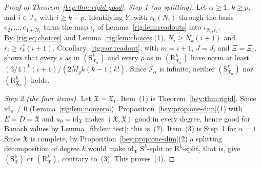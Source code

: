 \documentclass[11pt]{amsart}
\theoremstyle{definition}
\theoremstyle{remark}
\numberwithin{equation}{section}
\newcommand{\id}{\mathrm{id}}
\theoremstyle{plain}
\theoremstyle{definition}
\theoremstyle{plain}
\newcommand{\fX}{\mathfrak X}
\begin{document}
\begin{proof}[Proof of Theorem~\textup{\ref{bey:thm:rigid-good}}]
\emph{Step 1 (no splitting).} Let $\alpha\ge1$, $k\ge p$, and $i\in\mathcal I_\alpha$ with $i\ge k-p$. Identifying $Y_i$
with $c_0(N_i)$ through the basis $e_2,\dots,e_{1+N_i}$ turns the map $\iota_i$ of Lemma~\ref{rig:lem:readouts} into
$\iota_{N_i,r_i}$. By~\eqref{rig:eq:choices} and Lemma~\ref{rig:lem:choices}(1), $N_i\ge N_k(i+1)$ and
$r_i\ge r^*_k(i+1)$. Corollary~\ref{rig:cor:readout}, with $m=i+1$, $J=J_i$ and $\Xi=\Xi_i$, shows that every $s$ as in
$(\mathrm S^k_{\fX_\alpha})$ and every $\rho$ as in $(\mathrm R^k_{\fX_\alpha})$ have norm at least
$(3/4)^k(i+1)/(2M_\varrho k(k-1)k!)$. Since $\mathcal I_\alpha$ is infinite, neither $(\mathrm S^k_{\fX_\alpha})$ nor
$(\mathrm R^k_{\fX_\alpha})$ holds.

\emph{Step 2 (the four items).} Let $\fX=\fX_1$. Item~(1) is Theorem~\ref{bey:thm:rigid}. Since $\id_\fX\ne0$
(Lemma~\ref{rig:lem:nonzero}), Proposition~\ref{bey:prop:one-dim}(1) with $E=D=\fX$ and $u_0=\id_\fX$ makes $(\fX,\fX)$
good in every degree, hence good for Banach values by Lemma~\ref{fib:lem:test}; this is~(2). Item~(3) is Step~1 for
$\alpha=1$. Since $\fX$ is complete, by Proposition~\ref{bey:prop:one-dim}(2) a splitting decomposition of degree $k$
would make $\id_\fX$ $\mathrm S^k$-split or $\mathrm R^k$-split, that is, give $(\mathrm S^k_\fX)$ or
$(\mathrm R^k_\fX)$, contrary to~(3). This proves~(4).
\end{proof}
\end{document}
